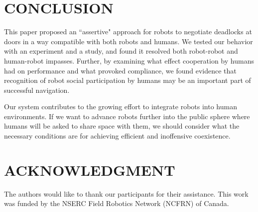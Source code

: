 \documentclass[letterpaper, 10 pt, conference]{ieeeconf}  %
\begin{document}
\section{CONCLUSION}

This paper proposed an ``assertive" approach for robots to negotiate deadlocks at doors in a way compatible with both robots and humans. We tested our behavior with an experiment and a study, and found it resolved both robot-robot and human-robot impasses. Further, by examining what effect cooperation by humans had on performance and what provoked compliance, we found evidence that recognition of robot social participation by humans may be an important part of successful navigation.

Our system contributes to the growing effort to integrate robots into human environments. If we want to advance robots further into the public sphere where humans will be asked to share space with them, we should consider what the necessary conditions are for achieving efficient and inoffensive coexistence.

\section*{ACKNOWLEDGMENT}

The authors would like to thank our participants for their assistance. This work was funded by the NSERC Field Robotics Network (NCFRN) of Canada.




\end{document}

